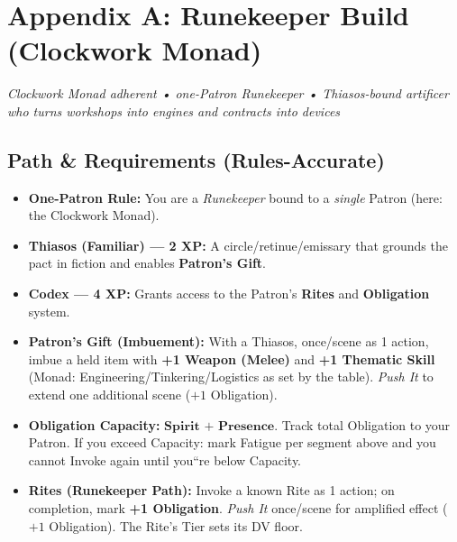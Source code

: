\documentclass[11pt]{article}
\begin{document}
\newpage
\appendix
\section{Appendix A: Runekeeper Build (Clockwork Monad)}
\textit{Clockwork Monad adherent • one-Patron Runekeeper • Thiasos-bound artificer who turns workshops into engines and contracts into devices}

\subsection*{Path \& Requirements (Rules-Accurate)}
\begin{itemize}[leftmargin=*]
  \item \textbf{One-Patron Rule:} You are a \emph{Runekeeper} bound to a \emph{single} Patron (here: the Clockwork Monad).
  \item \textbf{Thiasos (Familiar) --- 2 XP:} A circle/retinue/emissary that grounds the pact in fiction and enables \textbf{Patron's Gift}.
  \item \textbf{Codex --- 4 XP:} Grants access to the Patron's \textbf{Rites} and \textbf{Obligation} system.
  \item \textbf{Patron's Gift (Imbuement):} With a Thiasos, once/scene as 1 action, imbue a held item with \textbf{+1 Weapon (Melee)} and \textbf{+1 Thematic Skill} (Monad: Engineering/Tinkering/Logistics as set by the table). \emph{Push It} to extend one additional scene (\(+1\) Obligation).
  \item \textbf{Obligation Capacity:} \(\textbf{Spirit + Presence}\). Track total Obligation to your Patron. If you exceed Capacity: mark Fatigue per segment above and you cannot Invoke again until you``re below Capacity.
  \item \textbf{Rites (Runekeeper Path):} Invoke a known Rite as 1 action; on completion, mark \textbf{+1 Obligation}. \emph{Push It} once/scene for amplified effect (\(+1\) Obligation). The Rite's Tier sets its DV floor.
\end{itemize}
\end{document}
